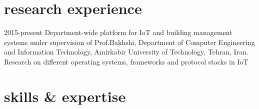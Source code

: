 \documentclass[]{friggeri-cv} %
\begin{document}

\section{research experience}

\begin{entrylist}

\entry
{2015-present}
{Department-wide platform for IoT and building management systems}
{under supervision of Prof.Bakhshi, Department of Computer Engineering and Information Technology, Amirkabir University of Technology, Tehran, Iran.}
{Research on different operating systems, frameworks and protocol stacks in IoT}

\end{entrylist}


\section{skills \& expertise}
\end{document}
